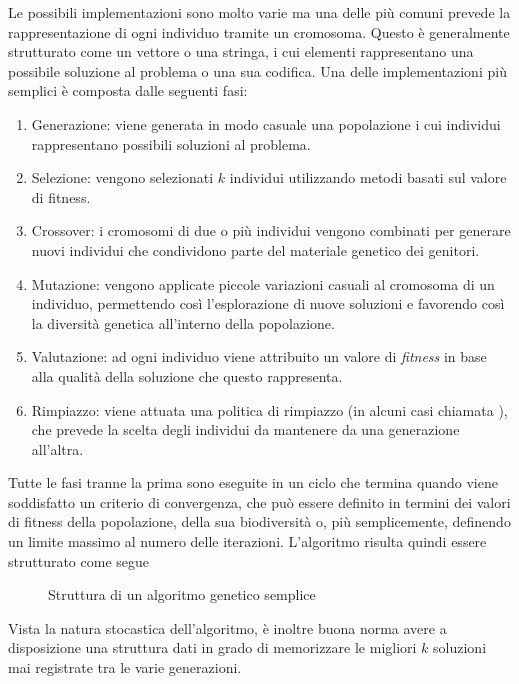 Le possibili implementazioni sono molto varie ma una delle più comuni prevede
la rappresentazione di ogni individuo tramite un cromosoma. Questo è
generalmente strutturato come un vettore o una stringa, i cui elementi
rappresentano una possibile soluzione al problema o una sua codifica. Una delle
implementazioni più semplici è composta dalle seguenti fasi:
\begin{enumerate}
      \item Generazione: viene generata in modo casuale una popolazione i cui
            individui rappresentano possibili soluzioni al problema.
      \item Selezione: vengono selezionati $k$ individui utilizzando metodi
            basati sul valore di fitness.
      \item Crossover: i cromosomi di due o più individui vengono combinati per
            generare nuovi individui che condividono parte del materiale genetico
            dei genitori.
      \item Mutazione: vengono applicate piccole variazioni casuali al cromosoma
            di un individuo, permettendo così l'esplorazione di nuove soluzioni e
            favorendo così la diversità genetica all'interno della popolazione.
      \item Valutazione: ad ogni individuo viene attribuito un valore di
            \textit{fitness} in base alla qualità della soluzione che questo
            rappresenta.
      \item Rimpiazzo: viene attuata una politica di rimpiazzo (in alcuni casi
            chiamata ), che prevede la scelta degli
            individui da mantenere da una generazione all'altra.
\end{enumerate}
Tutte le fasi tranne la prima sono eseguite in un ciclo che termina quando
viene soddisfatto un criterio di convergenza, che può essere definito in
termini dei valori di fitness della popolazione, della sua biodiversità o, più
semplicemente, definendo un limite massimo al numero delle iterazioni.
L'algoritmo risulta quindi essere strutturato come segue
\begin{figure}
      \centering
      
      \caption{Struttura di un algoritmo genetico semplice}
      \label{fig:simple_ga}
\end{figure}
Vista la natura stocastica dell'algoritmo, è inoltre buona norma avere a
disposizione una struttura dati in grado di memorizzare le migliori $k$
soluzioni mai registrate tra le varie generazioni.

